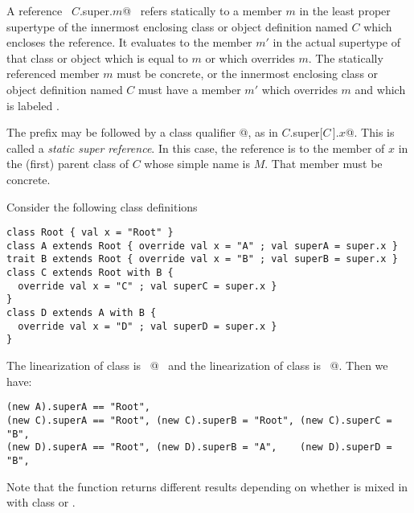 A reference ~\lstinline@$C$.super.$m$@~ refers statically to a member
$m$ in the least proper supertype of the innermost enclosing class or
object definition named $C$ which encloses the reference. It evaluates
to the member $m'$ in the actual supertype of that class or object
which is equal to $m$ or which overrides $m$.  The statically
referenced member $m$ must be concrete, or the innermost enclosing
class or object definition named $C$ must have a member $m'$ which
overrides $m$ and which is labeled .

The  prefix may be followed by a class qualifier
\lstinline@[$C\,$]@, as in \lstinline@$C$.super[$C\,$].$x$@. This is
called a {\em static super reference}.  In this case, the reference is
to the member of $x$ in the (first) parent class of $C$ whose simple
name is $M$. That member must be concrete.

\example\label{ex:super}
Consider the following class definitions

\begin{lstlisting}
class Root { val x = "Root" }
class A extends Root { override val x = "A" ; val superA = super.x }
trait B extends Root { override val x = "B" ; val superB = super.x }
class C extends Root with B { 
  override val x = "C" ; val superC = super.x }
}
class D extends A with B {
  override val x = "D" ; val superD = super.x }
}
\end{lstlisting}
The linearization of class  is ~@~ and
the linearization of class  is ~@.
Then we have:
\begin{lstlisting}
(new A).superA == "Root", 
(new C).superA == "Root", (new C).superB = "Root", (new C).superC = "B",
(new D).superA == "Root", (new D).superB = "A",    (new D).superD = "B",
\end{lstlisting}
Note that the  function returns different results
depending on whether  is mixed in with class  or .


